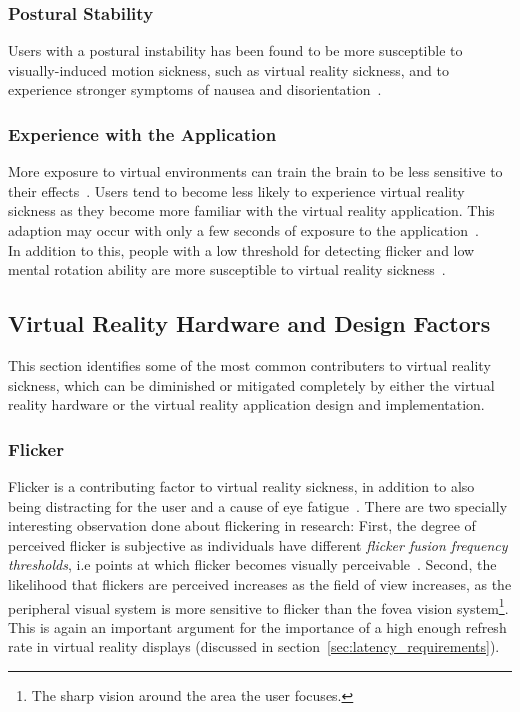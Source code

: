\subsubsection{Postural Stability}
Users with a postural instability has been found to be more susceptible to visually-induced motion sickness, such as virtual reality sickness, and to experience
stronger symptoms of nausea and disorientation~\citep{Kolasinski1995}. 

\subsubsection{Experience with the Application}
More exposure to virtual environments can train the brain to be less sensitive to their effects~\citep{Stanney2003}. Users tend to become less likely to experience
virtual reality sickness as they become more familiar with the virtual reality application. 
This adaption may occur with only a few seconds of exposure to the application~\citep{Kennedy1985}.\\

In addition to this, people with a low threshold for detecting flicker and low mental rotation ability are more susceptible to virtual reality sickness~\cite{Kolasinski1995}.

\subsection{Virtual Reality Hardware and Design Factors}
This section identifies some of the most common contributers to virtual reality sickness, which can be diminished or mitigated completely by either the virtual reality hardware
or the virtual reality application design and implementation. 

\subsubsection{Flicker}
Flicker is a contributing factor to virtual reality sickness, in addition to also being distracting for the user and a cause of eye fatigue~\citep{Jr2000}.
There are two specially interesting observation done about flickering in research: First, the degree of perceived flicker is subjective as 
individuals have different \textit{flicker fusion frequency thresholds}, i.e points at which flicker becomes visually perceivable~\citep{Pausch1992}.
Second, the likelihood that flickers are perceived increases as the field of view increases, as the peripheral visual system is more sensitive to flicker than 
the fovea vision system\footnote{The sharp vision around the area the user focuses.}. This is again an important argument for the importance of a high enough
refresh rate in virtual reality displays (discussed in section~\vref{sec:latency_requirements}). 

